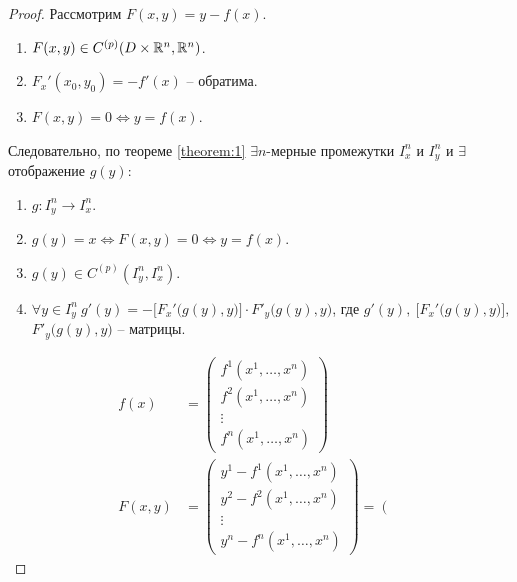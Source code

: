\begin{proof}
    Рассмотрим $ F(x,y) = y - f(x) $.
    \begin{enumerate}
        \item $ F(x,y) \in C^{(p)}(D\times \mathbb{R}^n, \mathbb{R}^n) $.
        \item $ F_x'(x_0,y_0) = - f'(x) $ -- обратима.
        \item $ F(x,y) = 0 \iff y = f(x) $.
    \end{enumerate}

    Следовательно, по теореме \ref{theorem:1} $ \exists n $-мерные промежутки $ I_x^n $ и $ I_y^n $ и $ \exists $ отображение $ g(y) $:
    \begin{enumerate}
        \item $ g:I_y^n \rightarrow I_x^n $.
        \item $ g(y) = x \iff F(x,y) = 0 \iff y = f(x) $.
        \item $ g(y)\in C^{(p)}(I_y^n, I_x^n) $.
        \item $ \forall y \in I_y^n \ g'(y) = - \Big[F_x'\big(g(y),y\big)\Big] \cdot F'_y\big(g(y),y\big) $, где $ g'(y), \ \Big[F_x'\big(g(y),y\big)\Big], $ \\ $ F'_y\big(g(y),y\big) $ -- матрицы.
    \end{enumerate}
    \begin{align*}
        f(x)      & = \left(\begin{matrix}
                                f^1(x^1,\ldots,x^n) \\
                                f^2(x^1,\ldots,x^n) \\
                                \vdots              \\
                                f^n(x^1,\ldots,x^n)
                            \end{matrix}\right)                                                                                       \\
        F(x,y)    & = \left(\begin{matrix}
                                y^1 - f^1(x^1,\ldots,x^n) \\
                                y^2 - f^2(x^1,\ldots,x^n) \\
                                \vdots                    \\
                                y^n - f^n(x^1,\ldots,x^n)
                            \end{matrix}\right) = \left(\begin{matrix}

\end{matrix}
\end{align*}
\end{proof}
